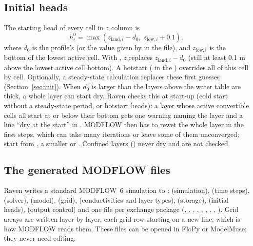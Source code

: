 \subsection{Initial heads}
The starting head of every cell in a column is
\begin{equation}
h^0_i=\max\!\left(z_{\mathrm{land},i}-d_0,\;z_{\mathrm{low},i}+0.1\right),
\end{equation}
where $d_0$ is the profile's  (or the value given by  in the 
file), and $z_{\mathrm{low},i}$ is the bottom of the lowest active cell. With , $z$ replaces $z_{\mathrm{land},i}-d_0$ (still at least 0.1 m above the lowest active cell bottom).
A hotstart ( in the ) overrides all of this cell by cell. Optionally, a steady-state
calculation replaces these first guesses (Section~\ref{sec:init}).
When $d_0$ is larger than the layers above the water table are thick, a whole layer can start dry. Raven checks this at
start-up (cold start without a steady-state period, or hotstart heads): a layer whose active convertible cells all start at
or below their bottom gets one warning naming the layer and a line ``dry at the start'' in .
MODFLOW then has to rewet the whole layer in the first steps, which can take many iterations or leave some of them
unconverged; start from , a smaller  or
. Confined layers () never dry and are not checked.

\subsection{The generated MODFLOW files}
Raven writes a standard MODFLOW~6 simulation to :  (simulation), 
(time steps),  (solver),  (model),  (grid),  (conductivities and
layer types),  (storage),  (initial heads),  (output control) and one file per
exchange package (, , , , , , ,
, ). Grid arrays are written layer by layer, each grid row starting on a new line, which is
how MODFLOW reads them. These files can be opened in FloPy or ModelMuse; they never need editing.

